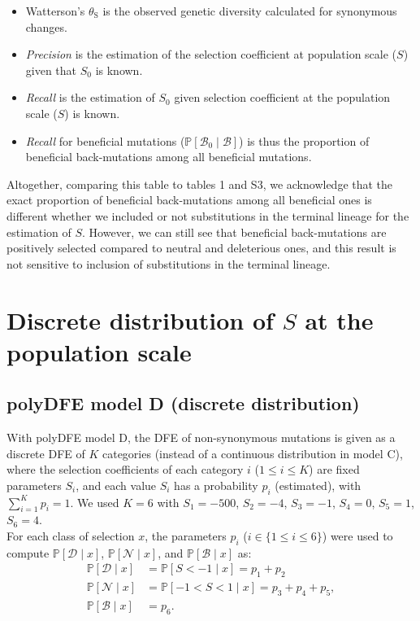 \documentclass[12pt]{article}
\newcommand{\proba}{\mathbb{P}}
\newcommand{\Sphy}{S_{0}}
\newcommand{\SphyBen}{\mathcal{B}_0}
\newcommand{\Sphyclass}{x}
\newcommand{\given}{\mid}
\newcommand{\Spop}{S}
\newcommand{\SpopDel}{\mathcal{D}}
\newcommand{\SpopNeu}{\mathcal{N}}
\newcommand{\SpopBen}{\mathcal{B}}
\newcommand{\thetaSyn}{\theta_{\text{S}}}
\begin{document}
    \begin{itemize}
        \item Watterson's $\thetaSyn$ is the observed genetic diversity calculated for synonymous changes.
        \item \textit{Precision} is the estimation of the selection coefficient at population scale ($\Spop$) given that $\Sphy$ is known.
        \item  \textit{Recall} is the estimation of $\Sphy$ given selection coefficient at the population scale ($\Spop$) is known.
        \item \textit{Recall} for beneficial mutations ($\proba [\SphyBen \given \SpopBen]$) is thus the proportion of beneficial back-mutations among all beneficial mutations.
    \end{itemize}

    Altogether, comparing this table to tables 1 and S3, we acknowledge that the exact proportion of beneficial back-mutations among all beneficial ones is different whether we included or not substitutions in the terminal lineage for the estimation of $\Spop$.
    However, we can still see that beneficial back-mutations are positively selected compared to neutral and deleterious ones, and this result is not sensitive to inclusion of substitutions in the terminal lineage.

    \newpage
    \section{Discrete distribution of $\Spop$ at the population scale}

    \subsection{polyDFE model D (discrete distribution)}
    With polyDFE model D, the DFE of non-synonymous mutations is given as a discrete DFE of $K$ categories (instead of a continuous distribution in model C), where the selection coefficients of each category $i$ ($1 \leq i \leq K$) are fixed parameters $\Spop_i$, and each value $\Spop_i$ has a probability $p_i$ (estimated), with $\sum_{i=1}^{K} p_i =1$.
    We used $K=6$ with $\Spop_1 = -500$, $\Spop_2 = -4$, $\Spop_3 =-1$, $\Spop_4 = 0$, $\Spop_5 = 1$, $\Spop_6 = 4$.\\
    For each class of selection $\Sphyclass$, the parameters $p_i$ ($i \in \{ 1 \leq i \leq 6 \}$) were used to compute $\proba [ \SpopDel \given  \Sphyclass] $, $\proba [ \SpopNeu \given \Sphyclass]$, and $\proba [ \SpopBen \given \Sphyclass]$ as:
    \begin{align}
        \proba [ \SpopDel \given  \Sphyclass] &= \proba [ \Spop < -1 \given \Sphyclass ] = p_1 + p_2 \label{eq:polyProbaDel-mD} \\
        \proba [ \SpopNeu \given \Sphyclass] &= \proba [ -1 < \Spop < 1 \given \Sphyclass ] = p_3 + p_4 + p_5,  \\
        \proba [ \SpopBen \given \Sphyclass] &= p_6. \label{eq:polyProbaAdv-mD}
    \end{align}
\end{document}
